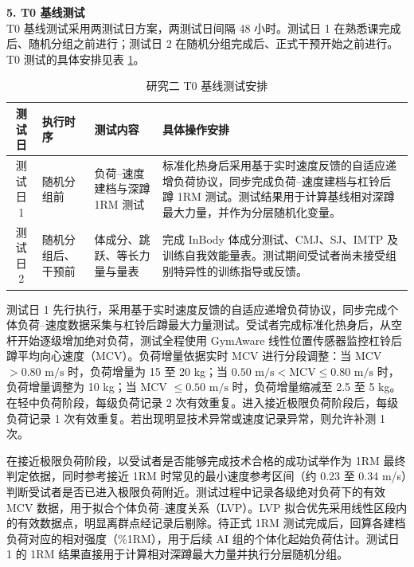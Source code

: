 \documentclass[UTF8,zihao=-4,twoside,openany]{ctexbook}
\begin{document}
\vspace{0.2cm}
\noindent \textbf{5. T0 基线测试} \\
T0 基线测试采用两测试日方案，两测试日间隔 48 小时。测试日 1 在熟悉课完成后、随机分组之前进行；测试日 2 在随机分组完成后、正式干预开始之前进行。T0 测试的具体安排见表 \ref{tab:ch3-t0}。

\begin{table}[htbp]
  \centering
  \caption{研究二 T0 基线测试安排}
  \label{tab:ch3-t0}
  \vspace{6pt}
  \small
  \begin{tabularx}{\textwidth}{|c|m{2.8cm}|m{3.5cm}|X|}
    \hline
    \textbf{测试日} & \textbf{执行时序} & \textbf{测试内容} & \textbf{具体操作安排} \\ \hline
    测试日 1 & 随机分组前 & 负荷--速度建档与深蹲 1RM 测试 & 标准化热身后采用基于实时速度反馈的自适应递增负荷协议，同步完成负荷--速度建档与杠铃后蹲 1RM 测试。测试结果用于计算基线相对深蹲最大力量，并作为分层随机化变量。 \\ \hline
    测试日 2 & 随机分组后、干预前 & 体成分、跳跃、等长力量与量表 & 完成 InBody 体成分测试、CMJ、SJ、IMTP 及训练自我效能量表。测试期间受试者尚未接受组别特异性的训练指导或反馈。 \\ \hline
  \end{tabularx}
\end{table}

测试日 1 先行执行，采用基于实时速度反馈的自适应递增负荷协议，同步完成个体负荷--速度数据采集与杠铃后蹲最大力量测试。受试者完成标准化热身后，从空杆开始逐级增加绝对负荷，测试全程使用 GymAware 线性位置传感器监控杠铃后蹲平均向心速度（MCV）。负荷增量依据实时 MCV 进行分段调整：当 MCV $>0.80\text{ m/s}$ 时，负荷增量为 15 至 20 kg；当 $0.50\text{ m/s} < \text{MCV} \le 0.80\text{ m/s}$ 时，负荷增量调整为 10 kg；当 MCV $\le 0.50\text{ m/s}$ 时，负荷增量缩减至 2.5 至 5 kg。在轻中负荷阶段，每级负荷记录 2 次有效重复。进入接近极限负荷阶段后，每级负荷记录 1 次有效重复。若出现明显技术异常或速度记录异常，则允许补测 1 次。

在接近极限负荷阶段，以受试者是否能够完成技术合格的成功试举作为 1RM 最终判定依据，同时参考接近 1RM 时常见的最小速度参考区间（约 0.23 至 0.34 m/s）判断受试者是否已进入极限负荷附近。测试过程中记录各级绝对负荷下的有效 MCV 数据，用于拟合个体负荷--速度关系（LVP）。LVP 拟合优先采用线性区段内的有效数据点，明显离群点经记录后剔除。待正式 1RM 测试完成后，回算各建档负荷对应的相对强度（\%1RM），用于后续 AI 组的个体化起始负荷估计。测试日 1 的 1RM 结果直接用于计算相对深蹲最大力量并执行分层随机分组。
\end{document}
